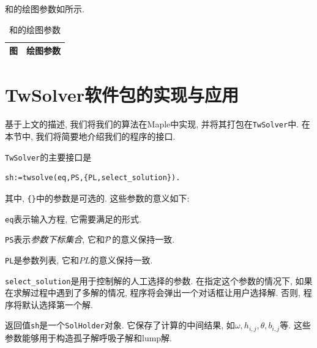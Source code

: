 和的绘图参数如所示.

\begin{table}
\centering 
\caption{和的绘图参数\label{jm-plist}}
\small
\renewcommand{\arraystretch}{1.1}
\begin{tabular}{cp{}}
\hline 
图 & \multicolumn{1}{c}{绘图参数} \\ 
\hline 

\hline
\end{tabular}
\end{table}

\section{TwSolver软件包的实现与应用}
基于上文的描述, 我们将我们的算法在Maple中实现, 并将其打包在\texttt{TwSolver}中. 在本节中, 我们将简要地介绍我们的程序的接口. 

\texttt{TwSolver}的主要接口是 
\begin{verbatim}
sh:=twsolve(eq,PS,{PL,select_solution}).
\end{verbatim}
其中, \verb|{}|中的参数是可选的. 这些参数的意义如下: 
\begin{compactitem}[\textbullet]
\item \texttt{eq}表示输入方程, 它需要满足的形式.
\item \texttt{PS}表示\emph{参数下标集合}, 它和$\mathcal{P}$的意义保持一致. 
\item \texttt{PL}是参数列表, 它和$PL$的意义保持一致.
\item \texttt{select\_solution}是用于控制解的人工选择的参数. 在指定这个参数的情况下, 如果在求解过程中遇到了多解的情况, 程序将会弹出一个对话框让用户选择解. 否则, 程序将默认选择第一个解.
\item 返回值\texttt{sh}是一个\texttt{SolHolder}对象. 它保存了计算的中间结果, 如$\omega,h_{i,j},\theta,b_{i,j}$等. 这些参数能够用于构造孤子解\zdh 呼吸子解和lump解. 
\end{compactitem}
    
